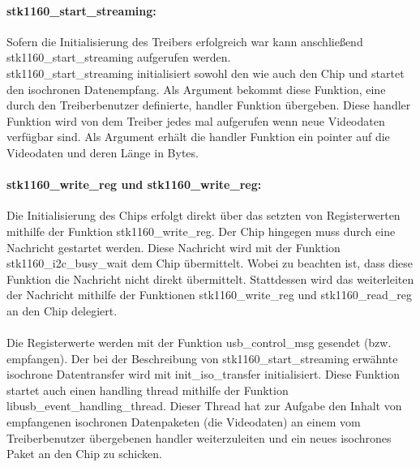 \paragraph{stk1160\_start\_streaming:}
Sofern die Initialisierung des Treibers erfolgreich war kann anschließend stk1160\_start\_streaming aufgerufen werden. \\ stk1160\_start\_streaming initialisiert sowohl den \stk{} wie auch den \saa{} Chip und startet den isochronen Datenempfang. Als Argument bekommt diese Funktion, eine durch den Treiberbenutzer definierte, handler Funktion übergeben. 
Diese handler Funktion wird von dem Treiber jedes mal aufgerufen wenn neue Videodaten verfügbar sind. Als Argument erhält die handler Funktion ein pointer auf die Videodaten und deren Länge in Bytes.

\paragraph{stk1160\_write\_reg und stk1160\_write\_reg:}
Die Initialisierung des \stk{} Chips erfolgt direkt über das setzten von Registerwerten mithilfe der Funktion stk1160\_write\_reg. Der \saa{} Chip hingegen muss durch eine \iic{} Nachricht gestartet werden. Diese Nachricht wird mit der Funktion stk1160\_i2c\_busy\_wait dem \saa{} Chip übermittelt. Wobei zu beachten ist, dass diese Funktion die Nachricht nicht direkt übermittelt. Stattdessen wird das weiterleiten der Nachricht mithilfe der Funktionen stk1160\_write\_reg und stk1160\_read\_reg an den \stk{} Chip delegiert. 

\paragraph{}
Die Registerwerte werden mit der Funktion usb\_control\_msg gesendet (bzw. empfangen). Der bei der Beschreibung von stk1160\_start\_streaming erwähnte isochrone Datentransfer wird mit init\_iso\_transfer initialisiert. Diese Funktion startet auch einen handling thread mithilfe der Funktion libusb\_event\_handling\_thread. Dieser Thread hat zur Aufgabe den Inhalt von empfangenen isochronen Datenpaketen (die Videodaten) an einem vom Treiberbenutzer übergebenen handler weiterzuleiten und ein neues isochrones Paket an den \stk{} Chip zu schicken. 

